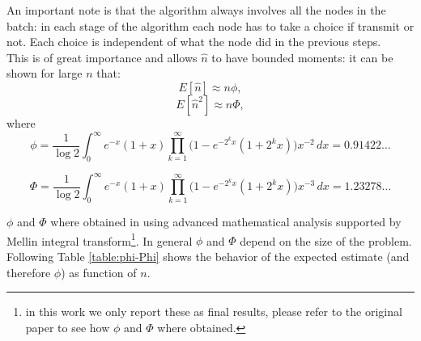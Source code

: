 \documentclass[12pt,a4paper]{report}
\begin{document}
An important note is that the algorithm always involves all the nodes in the batch: in each stage of the algorithm each node has to take a choice if transmit or not. 
Each choice is independent of what the node did in the previous steps. \\ 
This is of great importance and allows $\hat{n}$ to have bounded moments: it can be shown for large $n$ that:
\begin{equation}
E[\hat{n}] \approx n\phi,
\end{equation}
\begin{equation}
E[\hat{n}^{2}] \approx n\Phi,
\end{equation}
where
\begin{equation}
\phi= \frac{1}{\log2} \int_{0}^{\infty} \! e^{-x}(1+x) \prod_{k=1}^{\infty}\bigl(1-e^{-2^{k}x}(1+2^{k}x)\bigr)x^{-2} \, dx = 0.91422\dots
\end{equation}

\begin{equation}
\Phi= \frac{1}{\log2} \int_{0}^{\infty} \! e^{-x}(1+x) \prod_{k=1}^{\infty}\bigl(1-e^{-2^{k}x}(1+2^{k}x)\bigr)x^{-3} \, dx =1.23278\dots
\end{equation}

\noindent $\phi$ and $\Phi$ where obtained in \cite{greenberg87} using advanced mathematical analysis supported by Mellin integral transform\footnote{in this work we only report these as final results, please refer to the original paper to see how $\phi$ and $\Phi$ where obtained.}.
In general $\phi$ and $\Phi$ depend on the size of the problem. Following Table \ref{table:phi-Phi} shows the behavior of the expected estimate (and therefore $\phi$) as function of $n$.\\
\end{document}
